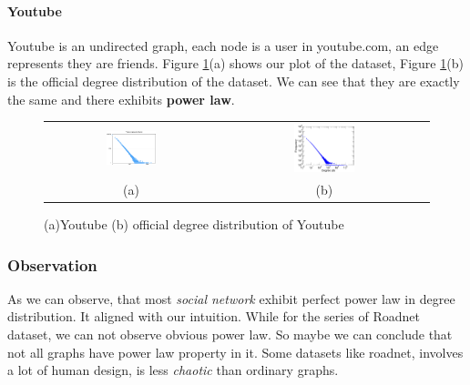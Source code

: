 \paragraph{Youtube}
Youtube is an undirected graph, each node is a user in youtube.com, an edge represents they are friends. Figure \ref{t1:youtube}(a) shows our plot of the dataset, Figure \ref{t1:youtube}(b) is the official degree distribution of the dataset. We can see that they are exactly the same and there exhibits {\bf power law}.
\begin{figure}[!htbf]
\begin{center}
\begin{tabular}{c c}
     \includegraphics[width=0.3\textwidth]{FIG/t1_youtube.png} & 
     \includegraphics[width=0.3\textwidth]{FIG/t1_youtube_truth.png}\\
    (a) & (b)\\
\end{tabular}
\caption{(a)Youtube (b) official degree distribution of Youtube}
\label{t1:youtube}
\end{center}
\end{figure}

\subsubsection{Observation}
As we can observe, that most \emph{social network} exhibit perfect power law in degree distribution. It aligned with our intuition. While for the series of Roadnet dataset, we can not observe obvious power law. So maybe we can conclude that not all graphs have power law property in it. Some datasets like roadnet, involves a lot of human design, is less \emph{chaotic} than ordinary graphs.
